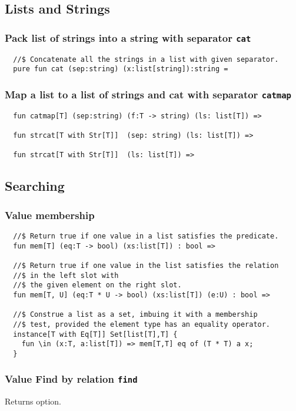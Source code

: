 \documentclass[oneside]{book}
\begin{document}
{\subsection{Lists and Strings}
\subsubsection{Pack list of strings into a string with separator {\tt cat}}
\begin{verbatim}
  //$ Concatenate all the strings in a list with given separator.
  pure fun cat (sep:string) (x:list[string]):string =
\end{verbatim}

\subsubsection{Map a list to a list of strings and cat with separator {\tt catmap}}
\begin{verbatim}
  fun catmap[T] (sep:string) (f:T -> string) (ls: list[T]) =>

  fun strcat[T with Str[T]]  (sep: string) (ls: list[T]) =>

  fun strcat[T with Str[T]]  (ls: list[T]) =>
\end{verbatim}

 
\subsection{Searching}
\subsubsection{Value membership}
\begin{verbatim}
  //$ Return true if one value in a list satisfies the predicate.
  fun mem[T] (eq:T -> bool) (xs:list[T]) : bool =>

  //$ Return true if one value in the list satisfies the relation 
  //$ in the left slot with 
  //$ the given element on the right slot.
  fun mem[T, U] (eq:T * U -> bool) (xs:list[T]) (e:U) : bool =>

  //$ Construe a list as a set, imbuing it with a membership
  //$ test, provided the element type has an equality operator.
  instance[T with Eq[T]] Set[list[T],T] {
    fun \in (x:T, a:list[T]) => mem[T,T] eq of (T * T) a x;
  }
\end{verbatim}

\subsubsection{Value Find by relation {\tt find}}
Returns option.

}
\end{document}
